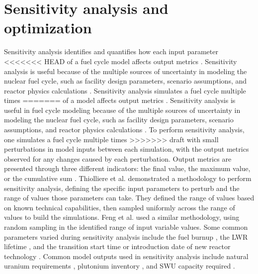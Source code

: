 \section{Sensitivity analysis and optimization}
Sensitivity analysis identifies and quantifies how each input parameter 
<<<<<<< HEAD
of a fuel cycle model affects output metrics \cite{thiolliere_methodology_2018}. 
Sensitivity analysis is useful because of the multiple sources of uncertainty in 
modeling the nuclear fuel cycle, such as facility design parameters, 
scenario assumptions, and reactor physics calculations 
\cite{noauthor_effects_2017}.
Sensitivity 
analysis simulates a fuel cycle multiple times 
=======
of a model affects output metrics \cite{thiolliere_methodology_2018}. 
Sensitivity analysis is useful in fuel cycle modeling because of the 
multiple sources of uncertainty in 
modeling the nuclear fuel cycle, such as facility design parameters, 
scenario assumptions, and reactor physics calculations 
\cite{noauthor_effects_2017}. To perform
sensitivity 
analysis, one simulates a fuel cycle multiple times 
>>>>>>> draft
with small perturbations in model inputs between each simulation, with 
the output metrics observed for any changes caused by each  
perturbation. Output metrics are presented through three different 
indicators: the final value, the maximum value, or the cumulative sum 
\cite{noauthor_effects_2017}. Thiolliere et al. 
\cite{thiolliere_methodology_2018} demonstrated a methodology to 
perform sensitivity analysis, defining the specific input parameters to 
perturb and the range of values those parameters can take.
They defined the range of values based on known technical capabilities, then 
sampled uniformly across the range of values to build the simulations. 
Feng et al. \cite{feng_sensitivity_2020} used a similar methodology, 
using random sampling in the identified range of input variable values.
Some common
parameters varied during sensitivity analysis include the fuel burnup 
\cite{thiolliere_methodology_2018,noauthor_effects_2017}, the \gls{LWR}
lifetime \cite{feng_sensitivity_2020,noauthor_effects_2017}, 
and the transition start time or introduction date of new reactor technology
\cite{chee_sensitivity_2019,passerini_systematic_2014,noauthor_effects_2017}. 
Common model outputs used in sensitivity analysis include 
natural uranium requirements 
\cite{richards_application_2021,noauthor_effects_2017},
plutonium inventory \cite{chee_sensitivity_2019,noauthor_effects_2017}, 
and \gls{SWU} 
capacity required \cite{richards_application_2021,noauthor_effects_2017}.

